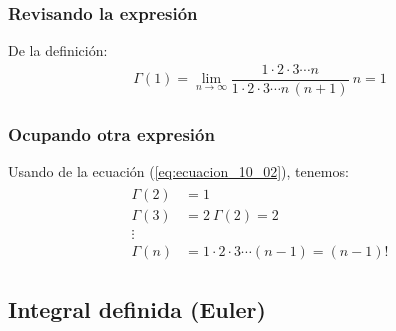 \documentclass[12pt]{beamer}
\begin{document}
\begin{frame}
\frametitle{Revisando la expresión}
De la definición:
\pause
\begin{align}
\Gamma (1) = \lim_{n \to \infty} \dfrac{1 \cdot 2 \cdot 3 \cdots n}{1 \cdot 2 \cdot 3 \cdots n \, (n + 1)} \: n = 1
\label{eq:ecuacion_10_03}
\end{align}
\end{frame}
\begin{frame}
\frametitle{Ocupando otra expresión}
Usando de la ecuación (\ref{eq:ecuacion_10_02}), tenemos:
\pause
\begin{align}
\begin{aligned}
\Gamma (2) &= 1 \\
\Gamma (3) &=  2 \: \Gamma(2) =  2 \\
\vdots \\
\Gamma (n) &= 1 \cdot 2 \cdot 3 \cdots (n-1) =  (n-1)!
\label{eq:ecuacion_10_04}
\end{aligned}
\end{align}
\end{frame}

\subsection{Integral definida (Euler)}
\end{document}
